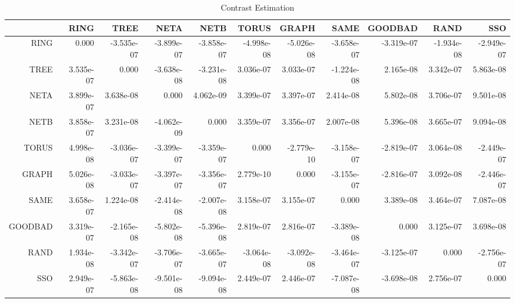 \documentclass[a4paper,10pt]{article}
\begin{document}
\begin{landscape}
\begin{table}[!htp]
\centering\tiny
\caption{Contrast Estimation}
\begin{tabular}{
|r|r|r|r|r|r|r|r|r|r|r|}
\hline
 & RING& TREE& NETA& NETB& TORUS& GRAPH& SAME& GOODBAD& RAND& SSO\\
\hline
 RING&0.000&-3.535e-07&-3.899e-07&-3.858e-07&-4.998e-08&-5.026e-08&-3.658e-07&-3.319e-07&-1.934e-08&-2.949e-07\\
\hline
 TREE&3.535e-07&0.000&-3.638e-08&-3.231e-08&3.036e-07&3.033e-07&-1.224e-08&2.165e-08&3.342e-07&5.863e-08\\
\hline
 NETA&3.899e-07&3.638e-08&0.000&4.062e-09&3.399e-07&3.397e-07&2.414e-08&5.802e-08&3.706e-07&9.501e-08\\
\hline
 NETB&3.858e-07&3.231e-08&-4.062e-09&0.000&3.359e-07&3.356e-07&2.007e-08&5.396e-08&3.665e-07&9.094e-08\\
\hline
 TORUS&4.998e-08&-3.036e-07&-3.399e-07&-3.359e-07&0.000&-2.779e-10&-3.158e-07&-2.819e-07&3.064e-08&-2.449e-07\\
\hline
 GRAPH&5.026e-08&-3.033e-07&-3.397e-07&-3.356e-07&2.779e-10&0.000&-3.155e-07&-2.816e-07&3.092e-08&-2.446e-07\\
\hline
 SAME&3.658e-07&1.224e-08&-2.414e-08&-2.007e-08&3.158e-07&3.155e-07&0.000&3.389e-08&3.464e-07&7.087e-08\\
\hline
 GOODBAD&3.319e-07&-2.165e-08&-5.802e-08&-5.396e-08&2.819e-07&2.816e-07&-3.389e-08&0.000&3.125e-07&3.698e-08\\
\hline
 RAND&1.934e-08&-3.342e-07&-3.706e-07&-3.665e-07&-3.064e-08&-3.092e-08&-3.464e-07&-3.125e-07&0.000&-2.756e-07\\
\hline
 SSO&2.949e-07&-5.863e-08&-9.501e-08&-9.094e-08&2.449e-07&2.446e-07&-7.087e-08&-3.698e-08&2.756e-07&0.000\\
\hline

\end{tabular}
\end{table}

\newpage


\end{landscape}
\end{document}
